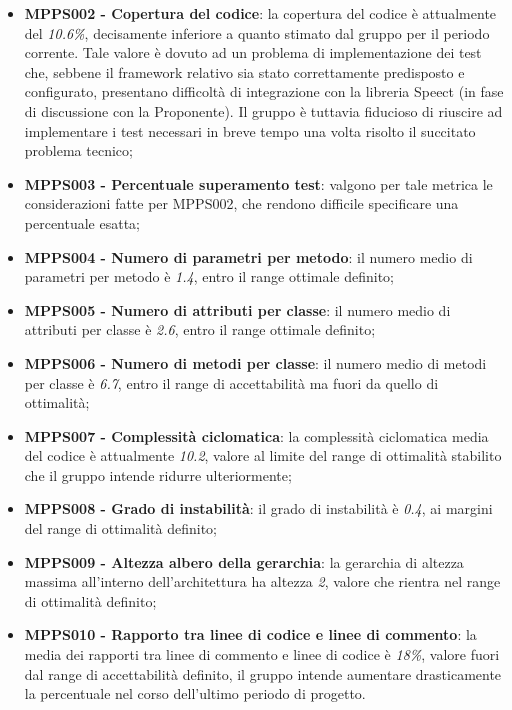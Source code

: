 \documentclass[openany,12pt,a4paper]{report}
\begin{document}
\begin{itemize}
	\item \textbf{MPPS002 - Copertura del codice}: la copertura del codice è attualmente del \textit{10.6\%}, decisamente inferiore a quanto stimato dal gruppo per il periodo corrente. Tale valore è dovuto ad un problema di implementazione dei test che, sebbene il framework relativo sia stato correttamente predisposto e configurato, presentano difficoltà di integrazione con la libreria Speect (in fase di discussione con la Proponente). Il gruppo è tuttavia fiducioso di riuscire ad implementare i test necessari in breve tempo una volta risolto il succitato problema tecnico;
	\item \textbf{MPPS003 - Percentuale superamento test}: valgono per tale metrica le considerazioni fatte per MPPS002, che rendono difficile specificare una percentuale esatta;
	\item \textbf{MPPS004 - Numero di parametri per metodo}: il numero medio di parametri per metodo è \textit{1.4}, entro il range ottimale definito;
	\item \textbf{MPPS005 - Numero di attributi per classe}: il numero medio di attributi per classe è \textit{2.6}, entro il range ottimale definito;
	\item \textbf{MPPS006 - Numero di metodi per classe}: il numero medio di metodi per classe è \textit{6.7}, entro il range di accettabilità ma fuori da quello di ottimalità;
	\item \textbf{MPPS007 - Complessità ciclomatica}: la complessità ciclomatica media del codice è attualmente \textit{10.2}, valore al limite del range di ottimalità stabilito che il gruppo intende ridurre ulteriormente;
	\item \textbf{MPPS008 - Grado di instabilità}: il grado di instabilità è \textit{0.4}, ai margini del range di ottimalità definito;
	\item \textbf{MPPS009 - Altezza albero della gerarchia}: la gerarchia di altezza massima all'interno dell'architettura ha altezza \textit{2}, valore che rientra nel range di ottimalità definito;
	\item \textbf{MPPS010 - Rapporto tra linee di codice e linee di commento}: la media dei rapporti tra linee di commento e linee di codice è \textit{18\%}, valore fuori dal range di accettabilità definito, il gruppo intende aumentare drasticamente la percentuale nel corso dell'ultimo periodo di progetto.
\end{itemize}

\end{document}
